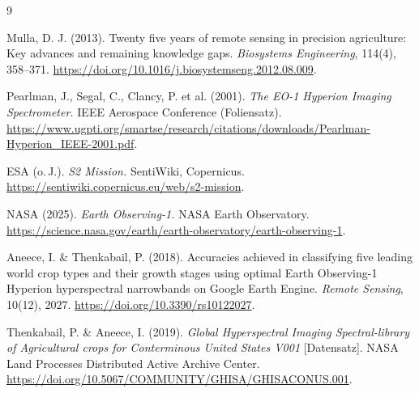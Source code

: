 \documentclass[11pt,a4paper,titlepage]{article}
\begin{document}
{\small
\begin{thebibliography}{9}

Mulla, D. J. (2013).
Twenty five years of remote sensing in precision agriculture:
Key advances and remaining knowledge gaps.
\emph{Biosystems Engineering}, 114(4), 358--371.
\url{https://doi.org/10.1016/j.biosystemseng.2012.08.009}.

Pearlman, J., Segal, C., Clancy, P. et al. (2001).
\emph{The EO-1 Hyperion Imaging Spectrometer.}
IEEE Aerospace Conference (Foliensatz).
\url{https://www.ugpti.org/smartse/research/citations/downloads/Pearlman-Hyperion_IEEE-2001.pdf}.

ESA (o.\,J.).
\emph{S2 Mission.} SentiWiki, Copernicus.
\url{https://sentiwiki.copernicus.eu/web/s2-mission}.

NASA (2025).
\emph{Earth Observing-1.} NASA Earth Observatory.
\url{https://science.nasa.gov/earth/earth-observatory/earth-observing-1}.

Aneece, I. \& Thenkabail, P. (2018).
Accuracies achieved in classifying five leading world crop types and their
growth stages using optimal Earth Observing-1 Hyperion hyperspectral
narrowbands on Google Earth Engine.
\emph{Remote Sensing}, 10(12), 2027.
\url{https://doi.org/10.3390/rs10122027}.

Thenkabail, P. \& Aneece, I. (2019).
\emph{Global Hyperspectral Imaging Spectral-library of Agricultural crops for
Conterminous United States V001} [Datensatz].
NASA Land Processes Distributed Active Archive Center.
\url{https://doi.org/10.5067/COMMUNITY/GHISA/GHISACONUS.001}.

\end{thebibliography}
}
\end{document}
